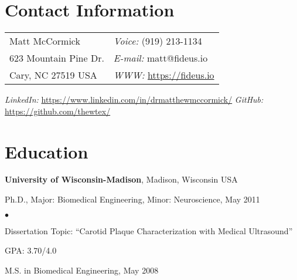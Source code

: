 \documentclass[margin,line]{res}
\newenvironment{list1}{
  \begin{list}{\ding{113}}{%
      \setlength{\itemsep}{0in}
      \setlength{\parsep}{0in} \setlength{\parskip}{0in}
      \setlength{\topsep}{0in} \setlength{\partopsep}{0in}
      \setlength{\leftmargin}{0.17in}}}{\end{list}}
\newenvironment{list2}{
  \begin{list}{$\bullet$}{%
      \setlength{\itemsep}{0in}
      \setlength{\parsep}{0in} \setlength{\parskip}{0in}
      \setlength{\topsep}{0in} \setlength{\partopsep}{0in}
      \setlength{\leftmargin}{0.2in}}}{\end{list}}
\begin{document}

\begin{resume}
\section{\sc Contact Information}
\vspace{.05in}
\begin{tabular}{@{}p{3in}p{4in}}
Matt McCormick                                          & {\it Voice:}  (919) 213-1134 \\
623 Mountain Pine Dr. & {\it E-mail:}  matt@fideus.io \\
Cary, NC 27519 USA & {\it WWW:} \url{https://fideus.io} \\
\end{tabular}

{\it LinkedIn:} \url{https://www.linkedin.com/in/drmatthewmccormick/} \newline
{\it GitHub:} \url{https://github.com/thewtex/} \newline



\section{\sc Education}
{\bf University of Wisconsin-Madison}, Madison, Wisconsin USA \\
\vspace*{-.1in}
\begin{list1}
\item[] Ph.D., Major: Biomedical Engineering, Minor: Neuroscience, May 2011
\begin{list2}
\vspace*{.05in}
\item Dissertation Topic:  ``Carotid Plaque Characterization with Medical
Ultrasound''
\item GPA: 3.70/4.0
\end{list2}
\vspace*{.05in}
\item[] M.S. in Biomedical Engineering, May 2008
\end{list1}


\end{resume}
\end{document}
